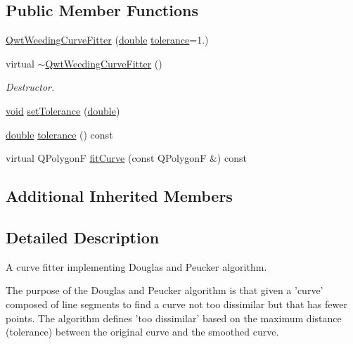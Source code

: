 \subsection*{Public Member Functions}
\begin{DoxyCompactItemize}
\item 
\hyperlink{class_qwt_weeding_curve_fitter_a7deb4d070a329cbdee454023194898a7}{Qwt\-Weeding\-Curve\-Fitter} (\hyperlink{_super_l_u_support_8h_a8956b2b9f49bf918deed98379d159ca7}{double} \hyperlink{class_qwt_weeding_curve_fitter_aa2e69ce083d02c4da0d669a082a15187}{tolerance}=1.)
\item 
virtual \hyperlink{class_qwt_weeding_curve_fitter_abbd30a948fc6974f881678f80a29768c}{$\sim$\-Qwt\-Weeding\-Curve\-Fitter} ()
\begin{DoxyCompactList}\small\item\em Destructor. \end{DoxyCompactList}\item 
\hyperlink{group___u_a_v_objects_plugin_ga444cf2ff3f0ecbe028adce838d373f5c}{void} \hyperlink{class_qwt_weeding_curve_fitter_a62c303f6826fef2be7b7bbe82f530680}{set\-Tolerance} (\hyperlink{_super_l_u_support_8h_a8956b2b9f49bf918deed98379d159ca7}{double})
\item 
\hyperlink{_super_l_u_support_8h_a8956b2b9f49bf918deed98379d159ca7}{double} \hyperlink{class_qwt_weeding_curve_fitter_aa2e69ce083d02c4da0d669a082a15187}{tolerance} () const 
\item 
virtual Q\-Polygon\-F \hyperlink{class_qwt_weeding_curve_fitter_aa316dc6c60ae0d0c74ef0bc0fc239f0b}{fit\-Curve} (const Q\-Polygon\-F \&) const 
\end{DoxyCompactItemize}
\subsection*{Additional Inherited Members}


\subsection{Detailed Description}
A curve fitter implementing Douglas and Peucker algorithm. 

The purpose of the Douglas and Peucker algorithm is that given a 'curve' composed of line segments to find a curve not too dissimilar but that has fewer points. The algorithm defines 'too dissimilar' based on the maximum distance (tolerance) between the original curve and the smoothed curve.

